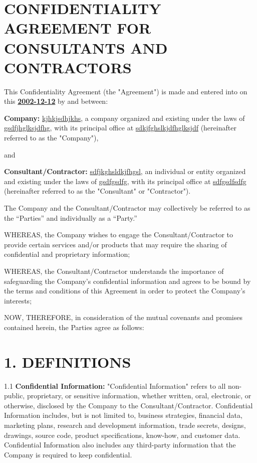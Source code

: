 \documentclass[12pt]{article}
\begin{document}
\section*{CONFIDENTIALITY AGREEMENT FOR CONSULTANTS AND CONTRACTORS}

This Confidentiality Agreement (the "Agreement") is made and entered into on this \textbf{\underline{2002-12-12}} by and between:

\textbf{Company:} \underline{kjhkjsdhjkhs}, a company organized and existing under the laws of \underline{gsdfjhglksjdfhg}, with its principal office at \underline{sdkjfghslkjdfhglksjdf} (hereinafter referred to as the "Company"),

and

\textbf{Consultant/Contractor:} \underline{sdfjkghsldkjfhgsl}, an individual or entity organized and existing under the laws of \underline{gsdfgsdfg}, with its principal office at \underline{sdfgsdfsdfg} (hereinafter referred to as the "Consultant" or "Contractor").

The Company and the Consultant/Contractor may collectively be referred to as the “Parties” and individually as a “Party.”

WHEREAS, the Company wishes to engage the Consultant/Contractor to provide certain services and/or products that may require the sharing of confidential and proprietary information;

WHEREAS, the Consultant/Contractor understands the importance of safeguarding the Company’s confidential information and agrees to be bound by the terms and conditions of this Agreement in order to protect the Company’s interests;

NOW, THEREFORE, in consideration of the mutual covenants and promises contained herein, the Parties agree as follows:

\section*{1. DEFINITIONS}

1.1 \textbf{Confidential Information:} "Confidential Information" refers to all non-public, proprietary, or sensitive information, whether written, oral, electronic, or otherwise, disclosed by the Company to the Consultant/Contractor. Confidential Information includes, but is not limited to, business strategies, financial data, marketing plans, research and development information, trade secrets, designs, drawings, source code, product specifications, know-how, and customer data. Confidential Information also includes any third-party information that the Company is required to keep confidential.
\end{document}
